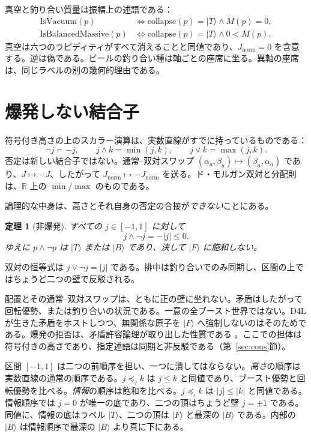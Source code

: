 \documentclass[a4paper]{article}
\newtheorem{theorem}{定理}[section]
\theoremstyle{definition}
\newcommand{\Jnorm}{J_{\mathrm{norm}}}
\begin{document}
真空と釣り合い質量は振幅上の述語である：
\begin{align*}
\mathrm{IsVacuum}(p)
  &\iff \mathrm{collapse}(p)=\lvert T\rangle \wedge M(p)=0,\\
\mathrm{IsBalancedMassive}(p)
  &\iff \mathrm{collapse}(p)=\lvert T\rangle \wedge 0<M(p).
\end{align*}
真空は六つのラピディティがすべて消えることと同値であり、\(\Jnorm=0\) を含意する。逆は偽である。ビールの釣り合い種は軸ごとの座席に坐る。異軸の座席は、同じラベルの別の幾何的理由である。

\section{爆発しない結合子}
\label{sec:conn}

符号付き高さの上のスカラー演算は、実数直線がすでに持っているものである：
\[
\neg j = -j,\qquad
j\wedge k = \min(j,k),\qquad
j\vee k = \max(j,k).
\]
否定は新しい結合子ではない。通常–双対スワップ \((\alpha_a,\beta_a)\mapsto(\beta_a,\alpha_a)\) であり、\(J\mapsto -J\)、したがって \(\Jnorm\mapsto-\Jnorm\) を送る。ド・モルガン双対と分配則は、\(\mathbb{R}\) 上の \(\min/\max\) のものである。

論理的な中身は、高さとそれ自身の否定の合接が\emph{できない}ことにある。

\begin{theorem}[非爆発]
\label{thm:nexplosion}
すべての \(j\in[-1,1]\) に対して
\[
j\wedge\neg j = -|j|\le 0.
\]
ゆえに \(p\wedge\neg p\) は \(\lvert T\rangle\) または \(\lvert B\rangle\) であり、決して \(\lvert F\rangle\) に飽和しない。
\end{theorem}

双対の恒等式は \(j\vee\neg j=\lvert j\rvert\) である。排中は釣り合いでのみ同期し、区間の上ではちょうど二つの壁で反駁される。

配置とその通常–双対スワップは、ともに正の壁に坐れない。矛盾はしたがって回転優勢、または釣り合いの状況である。一意の全ブースト世界ではない。D4L が生きた矛盾をホストしつつ、無関係な原子を \(\lvert F\rangle\) へ強制しないのはそのためである。爆発の拒否は、矛盾許容論理が取り出した性質である \cite{Priest2006}。ここでの担体は符号付きの高さであり、指定述語は同期と非反駁である（第~\ref{sec:cons}節）。

区間 \([-1,1]\) は二つの前順序を担い、一つに潰してはならない。\emph{高さ}の順序は実数直線の通常の順序である。\(j\preceq_\tau k\) は \(j\le k\) と同値であり、ブースト優勢と回転優勢を比べる。\emph{情報}の順序は飽和を比べる。\(j\preceq_\iota k\) は \(\lvert j\rvert\le\lvert k\rvert\) と同値である。情報順序では \(j=0\) が唯一の底であり、二つの頂はちょうど壁 \(j=\pm 1\) である。同値に、情報の底はラベル \(\lvert T\rangle\)、二つの頂は \(\lvert F\rangle\) と最深の \(\lvert B\rangle\) である。内部の \(\lvert B\rangle\) は情報順序で最深の \(\lvert B\rangle\) より真に下にある。
\end{document}
